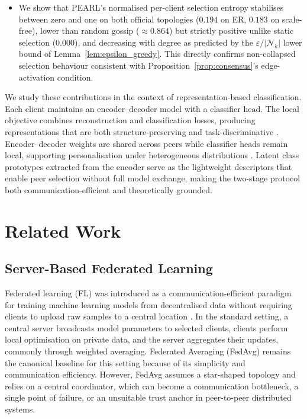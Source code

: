 \documentclass[conference]{IEEEtran}
\begin{document}
\begin{itemize}
    \item We show that \textsc{PEARL}'s normalised per-client selection entropy stabilises between zero and one on both official topologies ($0.194$ on ER, $0.183$ on scale-free), lower than random gossip ($\approx0.864$) but strictly positive unlike static selection ($0.000$), and decreasing with degree as predicted by the $\varepsilon/|\mathcal{N}_k|$ lower bound of Lemma~\ref{lem:epsilon_greedy}. This directly confirms non-collapsed selection behaviour consistent with Proposition~\ref{prop:consensus}'s edge-activation condition.
\end{itemize}

We study these contributions in the context of representation-based classification. Each client maintains an encoder--decoder model with a classifier head. The local objective combines reconstruction and classification losses, producing representations that are both structure-preserving and task-discriminative \cite{le2018supervised,chen2023auto}. Encoder--decoder weights are shared across peers while classifier heads remain local, supporting personalisation under heterogeneous distributions \cite{collins2021exploiting}. Latent class prototypes extracted from the encoder serve as the lightweight descriptors that enable peer selection without full model exchange, making the two-stage protocol both communication-efficient and theoretically grounded.

\section{Related Work}
\label{sec:related-work}

\subsection{Server-Based Federated Learning}
\label{subsec:server-based-federated-learning}
Federated learning (FL) was introduced as a communication-efficient paradigm for training machine learning models from decentralised data without requiring clients to upload raw samples to a central location \cite{mcmahan2017communication}. In the standard setting, a central server broadcasts model parameters to selected clients, clients perform local optimisation on private data, and the server aggregates their updates, commonly through weighted averaging. Federated Averaging (FedAvg) remains the canonical baseline for this setting because of its simplicity and communication efficiency. However, FedAvg assumes a star-shaped topology and relies on a central coordinator, which can become a communication bottleneck, a single point of failure, or an unsuitable trust anchor in peer-to-peer distributed systems.
\end{document}
